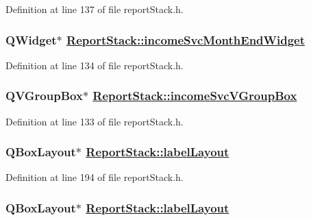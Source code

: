 Definition at line 137 of file report\-Stack.h.\hypertarget{classReportStack_r58}{
\subsubsection[incomeSvcMonthEndWidget]{\setlength{\rightskip}{0pt plus 5cm}QWidget$\ast$ \hyperlink{classReportStack_r58}{Report\-Stack::income\-Svc\-Month\-End\-Widget}}}
\label{classReportStack_r58}


Definition at line 134 of file report\-Stack.h.\hypertarget{classReportStack_r57}{
\subsubsection[incomeSvcVGroupBox]{\setlength{\rightskip}{0pt plus 5cm}QVGroup\-Box$\ast$ \hyperlink{classReportStack_r57}{Report\-Stack::income\-Svc\-VGroup\-Box}}}
\label{classReportStack_r57}


Definition at line 133 of file report\-Stack.h.\hypertarget{classReportStack_r108}{
\subsubsection[labelLayout]{\setlength{\rightskip}{0pt plus 5cm}QBox\-Layout$\ast$ \hyperlink{classReportStack_r82}{Report\-Stack::label\-Layout}}}
\label{classReportStack_r108}


Definition at line 194 of file report\-Stack.h.\hypertarget{classReportStack_r102}{
\subsubsection[labelLayout]{\setlength{\rightskip}{0pt plus 5cm}QBox\-Layout$\ast$ \hyperlink{classReportStack_r82}{Report\-Stack::label\-Layout}}}
\label{classReportStack_r102}


